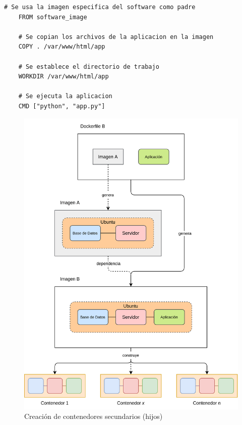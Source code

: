                 \begin{lstlisting}[style=dockerfile_style, caption={Dockerfile de una imagen secundaria (hija)}]
    # Se usa la imagen especifica del software como padre
    FROM software_image

    # Se copian los archivos de la aplicacion en la imagen
    COPY . /var/www/html/app

    # Se establece el directorio de trabajo
    WORKDIR /var/www/html/app

    # Se ejecuta la aplicacion
    CMD ["python", "app.py"]
                \end{lstlisting}
                
                \begin{figure}[!htbp]
                    \centering

                    \includegraphics[scale=0.15]{images/Diagramas/Contenedor B.png}

                    \caption{Creación de contenedores secundarios (hijos)}
                    \label{fig:contenedor-hijo}
                \end{figure}
                
